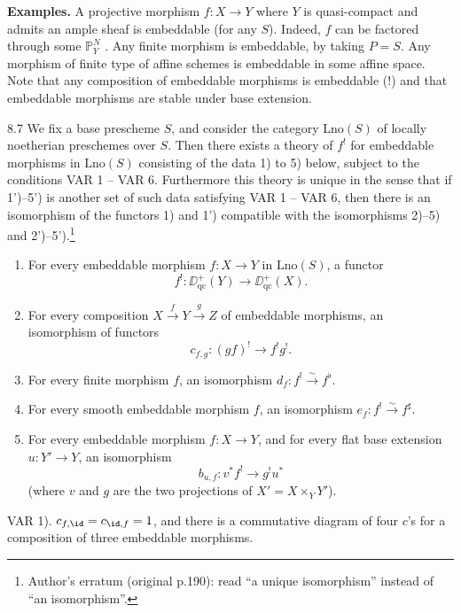 \textbf{Examples.}
A projective morphism $f\colon X\to Y$ where $Y$ is quasi-compact and admits an ample sheaf is embeddable (for any $S$). Indeed, $f$ can be factored through some $\mathbb{P}_Y^N$ \cite[\nopp II,~5.5.4(ii)]{EGA}. Any finite morphism is embeddable, by taking $P=S$. Any morphism of finite type of affine schemes is embeddable in some affine space. Note that any composition of embeddable morphisms is embeddable (!) and that embeddable morphisms are stable under base extension.

\begin{booktheorem}{8.7}\label{thm:3.8.7}
We fix a base prescheme $S$, and consider the category $\mathrm{Lno}(S)$ of locally noetherian preschemes over $S$. Then there exists a theory of $f^!$ for embeddable morphisms in $\mathrm{Lno}(S)$ consisting of the data 1) to 5) below, subject to the conditions VAR 1 -- VAR 6. Furthermore this theory is unique in the sense that if 1')--5') is another set of such data satisfying VAR 1 -- VAR 6, then there is an isomorphism of the functors 1) and 1') compatible with the isomorphisms 2)--5) and 2')--5').\footnote{Author's erratum (original p.190): read ``a unique isomorphism'' instead of ``an isomorphism''.}

\begin{enumerate}\renewcommand{\labelenumi}{\arabic{enumi})}
\item For every embeddable morphism $f\colon X\to Y$ in $\mathrm{Lno}(S)$, a functor
\[
f^!\colon \DD_{\mathrm{qc}}^+(Y) \longrightarrow \DD_{\mathrm{qc}}^+(X).
\]
\item For every composition $X\xrightarrow{f} Y\xrightarrow{g} Z$ of embeddable morphisms, an isomorphism of functors
\[
c_{f,g}\colon (gf)^! \longrightarrow f^!g^!.
\]
\item For every finite morphism $f$, an isomorphism $d_f\colon f^!\xrightarrow{\sim} f^{\flat}$.
\item For every smooth embeddable morphism $f$, an isomorphism $e_f\colon f^!\xrightarrow{\sim} f^{\sharp}$.
\item For every embeddable morphism $f\colon X\to Y$, and for every flat base extension $u\colon Y'\to Y$, an isomorphism
\[
b_{u,f}\colon v^*f^! \longrightarrow g^!u^*
\]
(where $v$ and $g$ are the two projections of $X'=X\times_Y Y'$).
\end{enumerate}

VAR 1). $c_{f,\id}=c_{\id,f}=1$, and there is a commutative diagram of four $c$'s for a composition of three embeddable morphisms.


\end{booktheorem}
